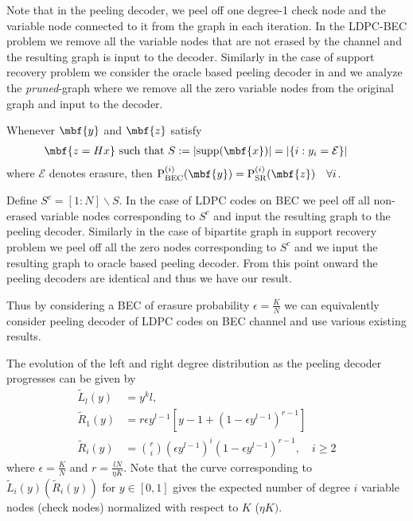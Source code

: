 \documentclass[conference]{IEEEtran}
\begin{document}
Note that in the peeling decoder, we peel off one degree-1 check node and the variable node connected to it from the graph in each iteration. In the LDPC-BEC problem we remove all the variable nodes that are not erased by the channel and the resulting graph is input to the decoder. Similarly in the case of support recovery problem we consider the  oracle based peeling decoder in \cite{li2015subdraft} and we analyze the \textit{pruned}-graph where we remove all the zero variable nodes from the original graph and input to the decoder.

\begin{lemma}
\label{Lemma:Equiv_LDPC_BEC}
Whenever $\mbf{y}$ and $\mbf{z}$ satisfy
\begin{align*}
\mbf{z=Hx} \text{ such that  } S:=|\text{supp}(\mbf{x})|=|\{i:y_i=\mathcal{E}\}|  \qquad
\end{align*}
where $\mathcal{E}$ denotes erasure, then $\text{P}_{\text{BEC}}^{(i)}(\mbf{y})=\text{P}_{\text{SR}}^{(i)}(\mbf{z}) \quad \forall i$.
\end{lemma}
\begin{IEEEproof}
Define $S^c=[1:N]\backslash S$. In the case of LDPC codes on BEC we peel off all non-erased variable nodes corresponding to $S^c$  and input the resulting graph to the peeling decoder. Similarly in the case of bipartite graph in support recovery problem we peel off all the zero nodes corresponding to $S^c$ and we input the resulting graph to oracle based peeling decoder. From this point onward the peeling decoders are identical and thus we have our result.
\end{IEEEproof}
\vspace{1ex}
Thus by considering a BEC of erasure probability $\epsilon=\frac{K}{N}$ we can equivalently consider peeling decoder of LDPC codes on BEC channel and use various existing results.
\begin{lemma}
\label{lem:RightDegEvolution}
The evolution of the left and right degree distribution as the peeling decoder progresses can be given by
\begin{align*}
\tilde{L}_l(y)&= y^kl,\\
\tilde{R}_{1}(y)&=r\epsilon y^{l-1}[y-1+ (1-\epsilon y^{l-1})^{r-1}]\\
\tilde{R}_{i}(y)&=\binom{r}{i}(\epsilon y^{l-1})^i (1-\epsilon y^{l-1})^{r-1}, \quad i\geq 2
\end{align*}
where $\epsilon=\frac{K}{N}$ and $r=\frac{lN}{\eta K}$. Note that the curve corresponding to $\tilde{L}_i(y)(\tilde{R}_{i}(y))$ for $y\in[0,1]$ gives the expected number of degree $i$ variable nodes (check nodes) normalized with respect to $K$ ($\eta K)$.
\end{lemma}
\end{document}
